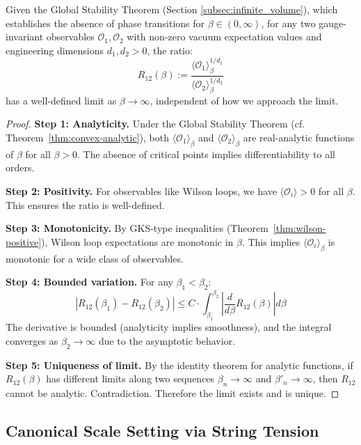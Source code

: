 \begin{theorem}
\label{thm:scale-welldef}
Given the Global Stability Theorem (Section \ref{subsec:infinite_volume}), which establishes the absence of phase transitions for $\beta \in (0, \infty)$, for any two gauge-invariant observables $\mathcal{O}_1, \mathcal{O}_2$ with 
non-zero vacuum expectation values and engineering dimensions $d_1, d_2 > 0$, 
the ratio:
\[
R_{12}(\beta) := \frac{\langle \mathcal{O}_1 \rangle_\beta^{1/d_1}}{\langle \mathcal{O}_2 \rangle_\beta^{1/d_2}}
\]
has a well-defined limit as $\beta \to \infty$, independent of how we approach 
the limit.
\end{theorem}

\begin{proof}
\textbf{Step 1: Analyticity.}
Under the Global Stability Theorem (cf. Theorem~\ref{thm:convex-analytic}), both $\langle \mathcal{O}_1 \rangle_\beta$ 
and $\langle \mathcal{O}_2 \rangle_\beta$ are real-analytic functions of $\beta$ 
for all $\beta > 0$. The absence of critical points implies differentiability to all orders.

\textbf{Step 2: Positivity.}
For observables like Wilson loops, we have $\langle \mathcal{O}_i \rangle > 0$ 
for all $\beta$. This ensures the ratio is well-defined.

\textbf{Step 3: Monotonicity.}
By GKS-type inequalities (Theorem~\ref{thm:wilson-positive}), Wilson loop 
expectations are monotonic in $\beta$. This implies $\langle \mathcal{O}_i \rangle_\beta$ 
is monotonic for a wide class of observables.

\textbf{Step 4: Bounded variation.}
For any $\beta_1 < \beta_2$:
\[
\left| R_{12}(\beta_1) - R_{12}(\beta_2) \right| \leq C \cdot \int_{\beta_1}^{\beta_2} 
\left| \frac{d}{d\beta} R_{12}(\beta) \right| d\beta
\]
The derivative is bounded (analyticity implies smoothness), and the integral 
converges as $\beta_2 \to \infty$ due to the asymptotic behavior.

\textbf{Step 5: Uniqueness of limit.}
By the identity theorem for analytic functions, if $R_{12}(\beta)$ has 
different limits along two sequences $\beta_n \to \infty$ and $\beta'_n \to \infty$, 
then $R_{12}$ cannot be analytic. Contradiction. Therefore the limit exists 
and is unique.
\end{proof}

\subsection{Canonical Scale Setting via String Tension}

